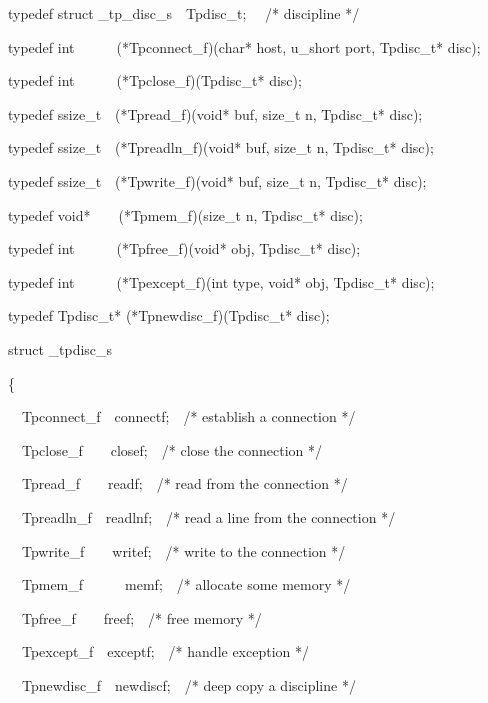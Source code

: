 \bigskip

{\ttfamily\mdseries
typedef struct \_tp\_disc\_s\ \ Tpdisc\_t; \ \ /* discipline */}


\bigskip

{\ttfamily\mdseries
typedef int\ \ \ \ \ \ (*Tpconnect\_f)(char* host, u\_short port, Tpdisc\_t* disc);}

{\ttfamily\mdseries
typedef int\ \ \ \ \ \ (*Tpclose\_f)(Tpdisc\_t* disc);}

{\ttfamily\mdseries
typedef ssize\_t\ \ (*Tpread\_f)(void* buf, size\_t n, Tpdisc\_t* disc);}

{\ttfamily\mdseries
typedef ssize\_t\ \ (*Tpreadln\_f)(void* buf, size\_t n, Tpdisc\_t* disc);}

{\ttfamily\mdseries
typedef ssize\_t\ \ (*Tpwrite\_f)(void* buf, size\_t n, Tpdisc\_t* disc);}

{\ttfamily\mdseries
typedef void*\ \ \ \ (*Tpmem\_f)(size\_t n, Tpdisc\_t* disc);}

{\ttfamily\mdseries
typedef int\ \ \ \ \ \ (*Tpfree\_f)(void* obj, Tpdisc\_t* disc);}

{\ttfamily\mdseries
typedef int\ \ \ \ \ \ (*Tpexcept\_f)(int type, void* obj, Tpdisc\_t* disc);}

{\ttfamily\mdseries
typedef Tpdisc\_t* (*Tpnewdisc\_f)(Tpdisc\_t* disc);}


\bigskip

{\ttfamily\mdseries
struct \_tpdisc\_s}

{\ttfamily\mdseries
\{}

{\ttfamily\mdseries
\ \ Tpconnect\_f\ \ connectf;\ \ /* establish a connection */}

{\ttfamily\mdseries
\ \ Tpclose\_f\ \ \ \ closef;\ \ /* close the connection */}

{\ttfamily\mdseries
\ \ Tpread\_f\ \ \ \ readf;\ \ /* read from the connection */}

{\ttfamily\mdseries
\ \ Tpreadln\_f\ \ readlnf;\ \ /* read a line from the connection */}

{\ttfamily\mdseries
\ \ Tpwrite\_f\ \ \ \ writef;\ \ /* write to the connection */}

{\ttfamily\mdseries
\ \ Tpmem\_f\ \ \ \ \ \ memf;\ \ /* allocate some memory */}

{\ttfamily\mdseries
\ \ Tpfree\_f\ \ \ \ freef;\ \ /* free memory */}

{\ttfamily\mdseries
\ \ Tpexcept\_f\ \ exceptf;\ \ /* handle exception */}

{\ttfamily\mdseries
\ \ Tpnewdisc\_f\ \ newdiscf;\ \ /* deep copy a discipline */}

